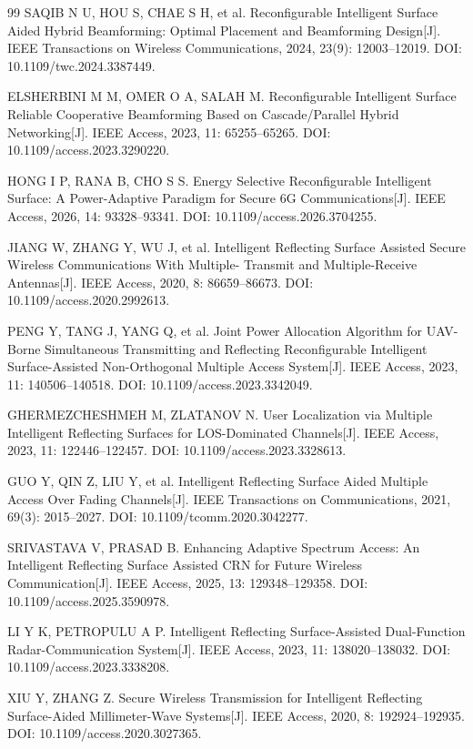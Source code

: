 \begin{thebibliography}{99}
 SAQIB N U, HOU S, CHAE S H, et al. Reconfigurable Intelligent Surface Aided Hybrid Beamforming: Optimal Placement and Beamforming Design[J]. IEEE Transactions on Wireless Communications, 2024, 23(9): 12003--12019. DOI: 10.1109/twc.2024.3387449.

 ELSHERBINI M M, OMER O A, SALAH M. Reconfigurable Intelligent Surface Reliable Cooperative Beamforming Based on Cascade/Parallel Hybrid Networking[J]. IEEE Access, 2023, 11: 65255--65265. DOI: 10.1109/access.2023.3290220.

 HONG I P, RANA B, CHO S S. Energy Selective Reconfigurable Intelligent Surface: A Power-Adaptive Paradigm for Secure 6G Communications[J]. IEEE Access, 2026, 14: 93328--93341. DOI: 10.1109/access.2026.3704255.

 JIANG W, ZHANG Y, WU J, et al. Intelligent Reflecting Surface Assisted Secure Wireless Communications With Multiple- Transmit and Multiple-Receive Antennas[J]. IEEE Access, 2020, 8: 86659--86673. DOI: 10.1109/access.2020.2992613.

 PENG Y, TANG J, YANG Q, et al. Joint Power Allocation Algorithm for UAV-Borne Simultaneous Transmitting and Reflecting Reconfigurable Intelligent Surface-Assisted Non-Orthogonal Multiple Access System[J]. IEEE Access, 2023, 11: 140506--140518. DOI: 10.1109/access.2023.3342049.

 GHERMEZCHESHMEH M, ZLATANOV N. User Localization via Multiple Intelligent Reflecting Surfaces for LOS-Dominated Channels[J]. IEEE Access, 2023, 11: 122446--122457. DOI: 10.1109/access.2023.3328613.

 GUO Y, QIN Z, LIU Y, et al. Intelligent Reflecting Surface Aided Multiple Access Over Fading Channels[J]. IEEE Transactions on Communications, 2021, 69(3): 2015--2027. DOI: 10.1109/tcomm.2020.3042277.

 SRIVASTAVA V, PRASAD B. Enhancing Adaptive Spectrum Access: An Intelligent Reflecting Surface Assisted CRN for Future Wireless Communication[J]. IEEE Access, 2025, 13: 129348--129358. DOI: 10.1109/access.2025.3590978.

 LI Y K, PETROPULU A P. Intelligent Reflecting Surface-Assisted Dual-Function Radar-Communication System[J]. IEEE Access, 2023, 11: 138020--138032. DOI: 10.1109/access.2023.3338208.

 XIU Y, ZHANG Z. Secure Wireless Transmission for Intelligent Reflecting Surface-Aided Millimeter-Wave Systems[J]. IEEE Access, 2020, 8: 192924--192935. DOI: 10.1109/access.2020.3027365.


\end{thebibliography}
